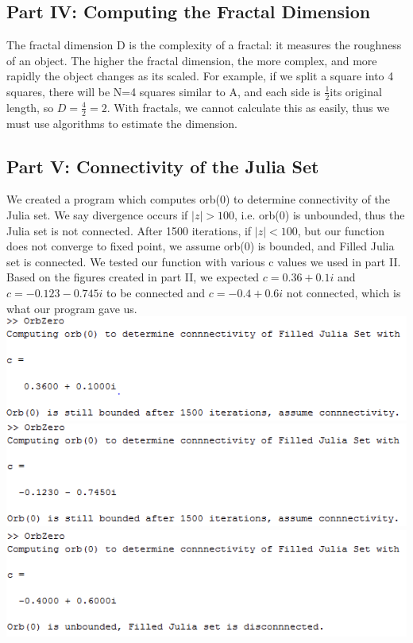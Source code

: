 \documentclass[11pt]{article}
\theoremstyle{plain}
\theoremstyle{definition}
\begin{document}
\subsection*{Part IV: Computing the Fractal Dimension}
The fractal dimension D is the complexity of a fractal: it measures the roughness of an object. The higher the fractal dimension, the more complex, and more rapidly the object changes as its scaled. For example, if we split a square into 4 squares, there will be N=4 squares similar to A, and each side is $ \frac{1}{2} $its original length, so $ D=\frac{4}{2}=2 $. With fractals, we cannot calculate this as easily, thus we must use algorithms to estimate the dimension.

\subsection*{Part V: Connectivity of the Julia Set }
We created a program which computes orb(0) to determine connectivity of the Julia set. We say divergence occurs if $ |z| > 100 $, i.e. orb(0) is unbounded, thus the Julia set is not connected. After 1500 iterations, if $  |z |< 100 $, but our function does not converge to fixed point, we assume orb(0) is bounded, and Filled Julia set is connected. We tested our function with various c values we used in part II. Based on the figures created in part II, we expected $ c=0.36+0.1i $ and $ c=-0.123-0.745i $ to be connected and $ c=-0.4+0.6i $ not connected, which is what our program gave us.\\

\includegraphics*[scale = 0.7]{Result1.png}\\
\includegraphics*[scale = 0.7]{Result2.png}\\
\includegraphics*[scale = 0.7]{Result3.png}
\end{document}
